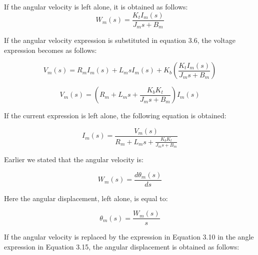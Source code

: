     If the angular velocity is left alone, it is obtained as follows: 
    \begin{equation}
        W_m(s) = \frac{K_t I_m(s)}{J_m s + B_m}
        \label{eq:omega_from_current}
        \end{equation}
        
        If the angular velocity expression is substituted in equation 3.6, the voltage expression becomes 
        as follows: 

                \begin{equation}
                     V_m(s) = R_m I_m(s) + L_m s I_m(s) + K_b \left( \frac{K_t I_m(s)}{J_m s + B_m} \right)
                    \label{eq:vm_substitution_step1}
                    \end{equation}
        
                    \begin{equation}
                        V_m(s) = \left( R_m + L_m s + \frac{K_b K_t}{J_m s + B_m} \right) I_m(s)
                        \label{eq:vm_substitution_step2}
                        \end{equation}
    
    If the current expression is left alone, the following equation is obtained:

                \begin{equation}
                    I_m(s) = \frac{V_m(s)}{R_m + L_m s + \frac{K_b K_t}{J_m s + B_m}}
                    \label{eq:current_expression}
                    \end{equation}
        
    Earlier we stated that the angular velocity is:

    \begin{equation}
        W_m(s) = \frac{d \theta_m(s)}{ds}
        \label{eq:angular_velocity_laplace}
        \end{equation}
        
        Here the angular displacement, left alone, is equal to:
        
        \begin{equation}
            \theta_m(s) = \frac{W_m(s)}{s}
            \label{eq:angular_displacement_laplace}
            \end{equation}
            
            If the angular velocity is replaced by the expression in Equation 3.10 in the angle expression in 
Equation 3.15, the angular displacement is obtained as follows: 

